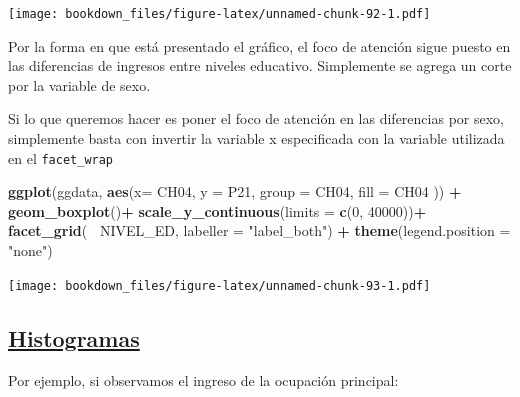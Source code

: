 \documentclass[]{book}
\newenvironment{Shaded}{\begin{snugshade}}{\end{snugshade}}
\newcommand{\DataTypeTok}[1]{\textcolor[rgb]{0.13,0.29,0.53}{#1}}
\newcommand{\DecValTok}[1]{\textcolor[rgb]{0.00,0.00,0.81}{#1}}
\newcommand{\KeywordTok}[1]{\textcolor[rgb]{0.13,0.29,0.53}{\textbf{#1}}}
\newcommand{\NormalTok}[1]{#1}
\newcommand{\OperatorTok}[1]{\textcolor[rgb]{0.81,0.36,0.00}{\textbf{#1}}}
\newcommand{\StringTok}[1]{\textcolor[rgb]{0.31,0.60,0.02}{#1}}
\begin{document}
\texttt{[image: bookdown\_files/figure-latex/unnamed-chunk-92-1.pdf]}

Por la forma en que está presentado el gráfico, el foco de atención sigue puesto en las diferencias de ingresos entre niveles educativo. Simplemente se agrega un corte por la variable de sexo.

Si lo que queremos hacer es poner el foco de atención en las diferencias por sexo, simplemente basta con invertir la variable x especificada con la variable utilizada en el \texttt{facet\_wrap}

\begin{Shaded}
\begin{Highlighting}[]
\KeywordTok{ggplot}\NormalTok{(ggdata, }\KeywordTok{aes}\NormalTok{(}\DataTypeTok{x=}\NormalTok{ CH04, }\DataTypeTok{y =}\NormalTok{ P21, }\DataTypeTok{group =}\NormalTok{ CH04, }\DataTypeTok{fill =}\NormalTok{ CH04 )) }\OperatorTok{+}
\StringTok{  }\KeywordTok{geom_boxplot}\NormalTok{()}\OperatorTok{+}
\StringTok{  }\KeywordTok{scale_y_continuous}\NormalTok{(}\DataTypeTok{limits =} \KeywordTok{c}\NormalTok{(}\DecValTok{0}\NormalTok{, }\DecValTok{40000}\NormalTok{))}\OperatorTok{+}
\StringTok{  }\KeywordTok{facet_grid}\NormalTok{(}\OperatorTok{~}\StringTok{ }\NormalTok{NIVEL_ED, }\DataTypeTok{labeller =} \StringTok{"label_both"}\NormalTok{) }\OperatorTok{+}
\StringTok{  }\KeywordTok{theme}\NormalTok{(}\DataTypeTok{legend.position =} \StringTok{"none"}\NormalTok{)}
\end{Highlighting}
\end{Shaded}

\texttt{[image: bookdown\_files/figure-latex/unnamed-chunk-93-1.pdf]}

\hypertarget{histogramas}{%
\subsection{\texorpdfstring{\href{https://ggplot2.tidyverse.org/reference/geom_histogram.html}{Histogramas}}{Histogramas}}\label{histogramas}}

Por ejemplo, si observamos el ingreso de la ocupación principal:

\begin{Shaded}
\end{Shaded}
\end{document}
